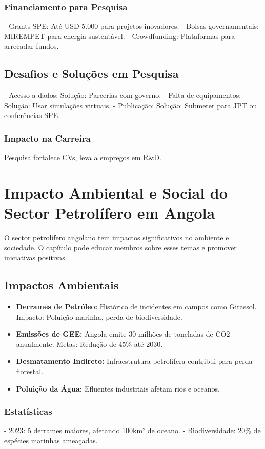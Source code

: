 \documentclass[12pt]{article}
\begin{document}
\subsubsection{Financiamento para Pesquisa}
- Grants SPE: Até USD 5.000 para projetos inovadores.
- Bolsas governamentais: MIREMPET para energia sustentável.
- Crowdfunding: Plataformas para arrecadar fundos.

\subsection{Desafios e Soluções em Pesquisa}
- Acesso a dados: Solução: Parcerias com governo.
- Falta de equipamentos: Solução: Usar simulações virtuais.
- Publicação: Solução: Submeter para JPT ou conferências SPE.

\subsubsection{Impacto na Carreira}
Pesquisa fortalece CVs, leva a empregos em R\&D.

\section{Impacto Ambiental e Social do Sector Petrolífero em Angola}

O sector petrolífero angolano tem impactos significativos no ambiente e sociedade. O capítulo pode educar membros sobre esses temas e promover iniciativas positivas.

\subsection{Impactos Ambientais}
\begin{itemize}
    \item \textbf{Derrames de Petróleo:} Histórico de incidentes em campos como Girassol. Impacto: Poluição marinha, perda de biodiversidade.
    \item \textbf{Emissões de GEE:} Angola emite 30 milhões de toneladas de CO2 anualmente. Metas: Redução de 45\% até 2030.
    \item \textbf{Desmatamento Indireto:} Infraestrutura petrolífera contribui para perda florestal.
    \item \textbf{Poluição da Água:} Efluentes industriais afetam rios e oceanos.
\end{itemize}

\subsubsection{Estatísticas}
- 2023: 5 derrames maiores, afetando 100km² de oceano.
- Biodiversidade: 20\% de espécies marinhas ameaçadas.
\end{document}
